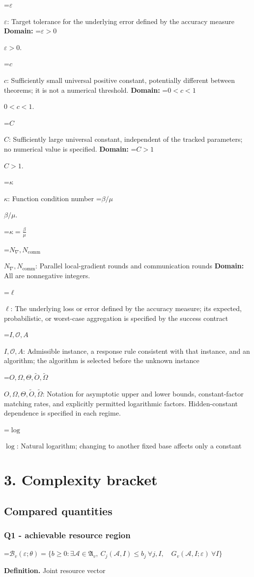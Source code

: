 \documentclass[10pt,a4paper]{article}
\newcommand{\AtlasMath}[1]{\par\begingroup\centering\setbox0=\hbox{$\displaystyle #1$}\ifdim\wd0>1.4\linewidth\typeout{ATLAS WIDE FORMULA: \the\wd0}\fi\ifdim\wd0>\linewidth\resizebox{\linewidth}{!}{\box0}\else\box0\fi\par\endgroup}
\newcommand{\AtlasInlineMath}[1]{\begingroup\setbox0=\hbox{$#1$}\ifdim\wd0>.4\linewidth\endgroup\AtlasMath{#1}\else\endgroup$#1$\fi}
\begin{document}
\AtlasInlineMath{\varepsilon}: Target tolerance for the underlying error defined by the accuracy measure \textbf{Domain:} \AtlasInlineMath{\varepsilon>0}.

\AtlasInlineMath{c}: Sufficiently small universal positive constant, potentially different between theorems; it is not a numerical threshold. \textbf{Domain:} \AtlasInlineMath{0<c<1}.

\AtlasInlineMath{C}: Sufficiently large universal constant, independent of the tracked parameters; no numerical value is specified. \textbf{Domain:} \AtlasInlineMath{C>1}.

\AtlasInlineMath{\kappa}: Function condition number \AtlasInlineMath{\beta/\mu}.


\AtlasMath{\kappa=\frac{\beta}{\mu}}


\AtlasInlineMath{N_{\nabla},N_{\mathrm{comm}}}: Parallel local-gradient rounds and communication rounds \textbf{Domain:} All are nonnegative integers.

\AtlasInlineMath{\ell}: The underlying loss or error defined by the accuracy measure; its expected, probabilistic, or worst-case aggregation is specified by the success contract

\AtlasInlineMath{I,\mathcal{O},A}: Admissible instance, a response rule consistent with that instance, and an algorithm; the algorithm is selected before the unknown instance

\AtlasInlineMath{O,\Omega,\Theta,\widetilde{O},\widetilde\Omega}: Notation for asymptotic upper and lower bounds, constant-factor matching rates, and explicitly permitted logarithmic factors. Hidden-constant dependence is specified in each regime.

\AtlasInlineMath{\log}: Natural logarithm; changing to another fixed base affects only a constant

\section{3. Complexity bracket}
\subsection{Compared quantities}
\subsubsection{Q1 - achievable resource region}
\AtlasMath{\mathcal B_v(\varepsilon;\theta)=\{b\ge0:\exists\mathcal A\in\mathfrak A_v,\ C_j(\mathcal A,I)\le b_j\ \forall j,I,\quad G_v(\mathcal A,I;\varepsilon)\ \forall I\}}
\textbf{Definition.} Joint resource vector
\end{document}
